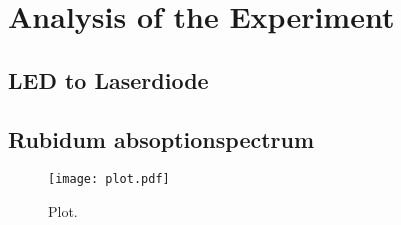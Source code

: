 \section{Analysis of the Experiment}
\label{sec:Auswertung}

\subsection{LED to Laserdiode}
\label{sec:LED_Laser}

\subsection{Rubidum absoptionspectrum}
\label{sec:ru_absoption}



\begin{figure}
  \centering
  \texttt{[image: plot.pdf]}
  \caption{Plot.}
  \label{fig:plot}
\end{figure}
